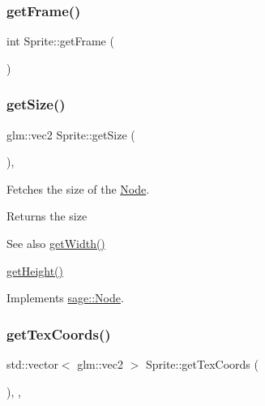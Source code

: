 \mbox{\label{classsage_1_1Sprite_af7d9465b0ef867d23cbb587b6c7b6b13}} 
\subsubsection{\texorpdfstring{getFrame()}{getFrame()}}
{\footnotesize\ttfamily int Sprite\+::get\+Frame (\begin{DoxyParamCaption}{ }\end{DoxyParamCaption})}

\mbox{\label{classsage_1_1Sprite_ab6c3b12b45eeafab8e816207158121a1}} 
\subsubsection{\texorpdfstring{getSize()}{getSize()}}
{\footnotesize\ttfamily glm\+::vec2 Sprite\+::get\+Size (\begin{DoxyParamCaption}{ }\end{DoxyParamCaption})\hspace{0.3cm}{\ttfamily [override]}, {\ttfamily [virtual]}}



Fetches the size of the \mbox{\hyperlink{classsage_1_1Node}{Node}}. 

\begin{DoxyReturn}{Returns}
the size 
\end{DoxyReturn}
\begin{DoxySeeAlso}{See also}
\mbox{\hyperlink{classsage_1_1Node_a65163ffabcfe9f482282ea37ead6fc5f}{get\+Width()}} 

\mbox{\hyperlink{classsage_1_1Node_a6af5a8378ac8d2c3490adbc2a03f1247}{get\+Height()}} 
\end{DoxySeeAlso}


Implements \mbox{\hyperlink{classsage_1_1Node_a286d3b5b0d16d31991b58cab972fb03b}{sage\+::\+Node}}.

\mbox{\label{classsage_1_1Sprite_a3e5acc98484d2f326fdd1ff622cfd2ff}} 
\subsubsection{\texorpdfstring{getTexCoords()}{getTexCoords()}}
{\footnotesize\ttfamily std\+::vector$<$ glm\+::vec2 $>$ Sprite\+::get\+Tex\+Coords (\begin{DoxyParamCaption}{ }\end{DoxyParamCaption})\hspace{0.3cm}{\ttfamily [override]}, {\ttfamily [protected]}, {\ttfamily [virtual]}}



